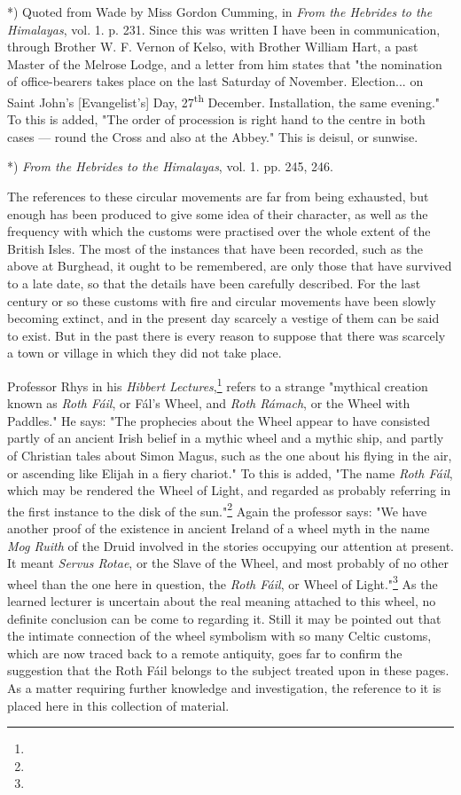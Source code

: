 \documentclass[a4paper, 11pt, oneside, polutonikogreek, english]{article}
\begin{document}
*) Quoted from Wade by Miss Gordon Cumming, in \emph{From the Hebrides to the Himalayas}, vol. 1. p. 231. Since this was written I have been in communication, through Brother W. F. Vernon of Kelso, with Brother William Hart, a past Master of the Melrose Lodge, and a letter from him states that "the nomination of office-bearers takes place on the last Saturday of November. Election... on Saint John's [Evangelist's] Day, 27\textsuperscript{th} December. Installation, the same evening." To this is added, "The order of procession is right hand to the centre in both cases --- round the Cross and also at the Abbey." This is deisul, or sunwise.

*) \emph{From the Hebrides to the Himalayas}, vol. 1. pp. 245, 246.

The references to these circular movements are far from being exhausted, but enough has been produced to give some idea of their character, as well as the frequency with which the customs were practised over the whole extent of the British Isles. The most of the instances that have been recorded, such as the above at Burghead, it ought to be remembered, are only those that have survived to a late date, so that the details have been carefully described. For the last century or so these customs with fire and circular movements have been slowly becoming extinct, and in the present day scarcely a vestige of them can be said to exist. But in the past there is every reason to suppose that there was scarcely a town or village in which they did not take place.

Professor Rhys in his \emph{Hibbert Lectures},\footnote{} refers to a strange "mythical creation known as \emph{Roth Fáil}, or Fál's Wheel, and \emph{Roth Rámach}, or the Wheel with Paddles." He says: "The prophecies about the Wheel appear to have consisted partly of an ancient Irish belief in a mythic wheel and a mythic ship, and partly of Christian tales about Simon Magus, such as the one about his flying in the air, or ascending like Elijah in a fiery chariot." To this is added, "The name \emph{Roth Fáil}, which may be rendered the Wheel of Light, and regarded as probably referring in the first instance to the disk of the sun."\footnote{} Again the professor says: "We have another proof of the existence in ancient Ireland of a wheel myth in the name \emph{Mog Ruith} of the Druid involved in the stories occupying our attention at present. It meant \emph{Servus Rotae}, or the Slave of the Wheel, and most probably of no other wheel than the one here in question, the \emph{Roth Fáil}, or Wheel of Light."\footnote{} As the learned lecturer is uncertain about the real meaning attached to this wheel, no definite conclusion can be come to regarding it. Still it may be pointed out that the intimate connection of the wheel symbolism with so many Celtic customs, which are now traced back to a remote antiquity, goes far to confirm the suggestion that the Roth Fáil belongs to the subject treated upon in these pages. As a matter requiring further knowledge and investigation, the reference to it is placed here in this collection of material.
\end{document}
